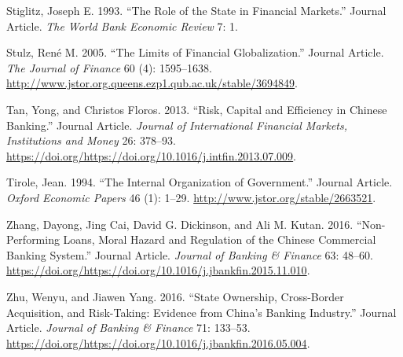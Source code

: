 \documentclass{article}
\begin{document}
\leavevmode\hypertarget{ref-RN73}{}%
Stiglitz, Joseph E. 1993. ``The Role of the State in Financial
Markets.'' Journal Article. \emph{The World Bank Economic Review} 7: 1.

\leavevmode\hypertarget{ref-RN74}{}%
Stulz, René M. 2005. ``The Limits of Financial Globalization.'' Journal
Article. \emph{The Journal of Finance} 60 (4): 1595--1638.
\url{http://www.jstor.org.queens.ezp1.qub.ac.uk/stable/3694849}.

\leavevmode\hypertarget{ref-RN75}{}%
Tan, Yong, and Christos Floros. 2013. ``Risk, Capital and Efficiency in
Chinese Banking.'' Journal Article. \emph{Journal of International
Financial Markets, Institutions and Money} 26: 378--93.
\url{https://doi.org/https://doi.org/10.1016/j.intfin.2013.07.009}.

\leavevmode\hypertarget{ref-RN76}{}%
Tirole, Jean. 1994. ``The Internal Organization of Government.'' Journal
Article. \emph{Oxford Economic Papers} 46 (1): 1--29.
\url{http://www.jstor.org/stable/2663521}.

\leavevmode\hypertarget{ref-RN77}{}%
Zhang, Dayong, Jing Cai, David G. Dickinson, and Ali M. Kutan. 2016.
``Non-Performing Loans, Moral Hazard and Regulation of the Chinese
Commercial Banking System.'' Journal Article. \emph{Journal of Banking
\& Finance} 63: 48--60.
\url{https://doi.org/https://doi.org/10.1016/j.jbankfin.2015.11.010}.

\leavevmode\hypertarget{ref-RN78}{}%
Zhu, Wenyu, and Jiawen Yang. 2016. ``State Ownership, Cross-Border
Acquisition, and Risk-Taking: Evidence from China's Banking Industry.''
Journal Article. \emph{Journal of Banking \& Finance} 71: 133--53.
\url{https://doi.org/https://doi.org/10.1016/j.jbankfin.2016.05.004}.



\end{document}
